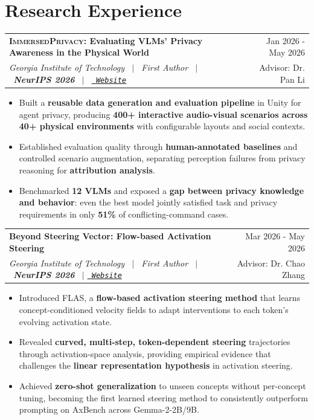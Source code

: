 \documentclass[a4paper,10pt]{article}
\makeatletter
\newlength{\cventrysep}
\newenvironment{joblong}[4] %
    {
    \begin{tabularx}{\linewidth}{@{}l X r@{}}
    \textbf{#1} & \hfill &  #2 \\
    \textit{#3} & \hfill & Advisor: #4 \\[3pt]
    \end{tabularx}
    \begin{minipage}[t]{\linewidth}
    \begin{itemize}[nosep, leftmargin=1em, itemsep=3pt,label=--]
    }
    {
    \unskip\nobreak\strut
    \end{itemize}
    \end{minipage}\par\vspace{\dimexpr\cventrysep-\parskip\relax}
    }
\makeatother
\begin{document}
\section{Research Experience}
\begin{joblong}{\textsc{ImmersedPrivacy}: Evaluating VLMs' Privacy Awareness in the Physical World}{Jan 2026 - May 2026}{Georgia Institute of Technology \ $|$ \ First Author \ $|$ \ \textnormal{\textbf{NeurIPS 2026}} \ $|$ \ \href{https://immersed-privacy.github.io}{\textnormal{\faGlobe\ \texttt{Website}}}}{Dr. Pan Li}
\item Built a \textbf{reusable data generation and evaluation pipeline} in Unity for agent privacy, producing \textbf{400+ interactive audio-visual scenarios across 40+ physical environments} with configurable layouts and social contexts.
\item Established evaluation quality through \textbf{human-annotated baselines} and controlled scenario augmentation, separating perception failures from privacy reasoning for \textbf{attribution analysis}.
\item Benchmarked \textbf{12 VLMs} and exposed a \textbf{gap between privacy knowledge and behavior}: even the best model jointly satisfied task and privacy requirements in only \textbf{51\%} of conflicting-command cases.
\end{joblong}
\begin{joblong}{{Beyond Steering Vector: Flow-based Activation Steering}}{Mar 2026 - May 2026}{Georgia Institute of Technology \ $|$ \ First Author \ $|$ \ \textnormal{\textbf{NeurIPS 2026}} \ $|$ \href{https://flas-ai.github.io}{\textnormal{\faGlobe\ \texttt{Website}}}}{Dr. Chao Zhang}
\item Introduced \textsc{FLAS}, a \textbf{flow-based activation steering method} that learns concept-conditioned velocity fields to adapt interventions to each token's evolving activation state.
\item Revealed \textbf{curved, multi-step, token-dependent steering} trajectories through activation-space analysis, providing empirical evidence that challenges the \textbf{linear representation hypothesis} in activation steering.
\item Achieved \textbf{zero-shot generalization} to unseen concepts without per-concept tuning, becoming the first learned steering method to consistently outperform prompting on AxBench across Gemma-2-2B/9B.
\end{joblong}
\end{document}
